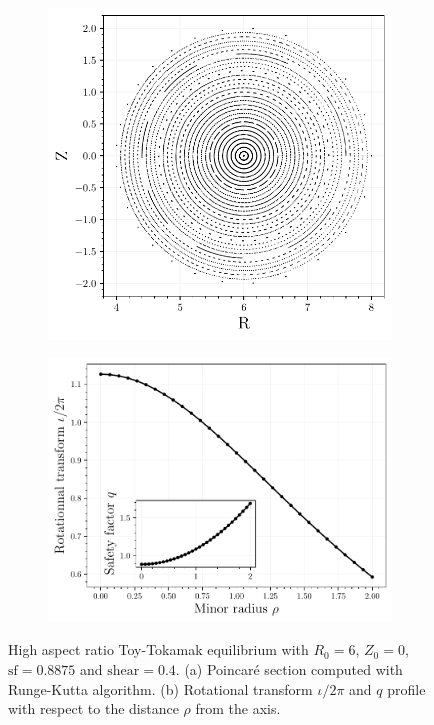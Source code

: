 \begin{figure}
    \centering
    \begin{subfigure}[t]{0.43\textwidth}
        \centering
        \includegraphics[width=\textwidth]{images/high-aspect-ratio/unperturbed.pdf}
        \caption{\label{fig:toyha-basis-p}}
    \end{subfigure}
    \hfill
    \begin{subfigure}[t]{0.54\textwidth}
        \centering
        \includegraphics[width=\textwidth]{images/high-aspect-ratio/iota_q.pdf}
        \caption{\label{fig:toyha-basis-iotaq}}
    \end{subfigure}
    \caption{High aspect ratio Toy-Tokamak equilibrium with $R_0 = 6$, $Z_0 = 0$, $\text{sf} = 0.8875$ and $\text{shear} = 0.4$. (a) Poincar\'e section computed with Runge-Kutta algorithm. (b) Rotational transform $\iota/2\pi$ and $q$ profile with respect to the distance $\rho$ from the axis.}
    \label{fig:toyha-basis}
\end{figure}

